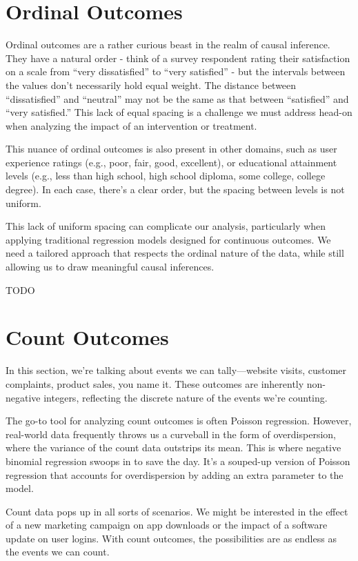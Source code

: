 \documentclass[
  letterpaper,
  DIV=11,
  numbers=noendperiod]{scrreprt}
\begin{document}
\section{Ordinal Outcomes}\label{ordinal-outcomes}

Ordinal outcomes are a rather curious beast in the realm of causal
inference. They have a natural order - think of a survey respondent
rating their satisfaction on a scale from ``very dissatisfied'' to
``very satisfied'' - but the intervals between the values don't
necessarily hold equal weight. The distance between ``dissatisfied'' and
``neutral'' may not be the same as that between ``satisfied'' and ``very
satisfied.'' This lack of equal spacing is a challenge we must address
head-on when analyzing the impact of an intervention or treatment.

This nuance of ordinal outcomes is also present in other domains, such
as user experience ratings (e.g., poor, fair, good, excellent), or
educational attainment levels (e.g., less than high school, high school
diploma, some college, college degree). In each case, there's a clear
order, but the spacing between levels is not uniform.

This lack of uniform spacing can complicate our analysis, particularly
when applying traditional regression models designed for continuous
outcomes. We need a tailored approach that respects the ordinal nature
of the data, while still allowing us to draw meaningful causal
inferences.

TODO

\section{Count Outcomes}\label{count-outcomes}

In this section, we're talking about events we can tally---website
visits, customer complaints, product sales, you name it. These outcomes
are inherently non-negative integers, reflecting the discrete nature of
the events we're counting.

The go-to tool for analyzing count outcomes is often Poisson regression.
However, real-world data frequently throws us a curveball in the form of
overdispersion, where the variance of the count data outstrips its mean.
This is where negative binomial regression swoops in to save the day.
It's a souped-up version of Poisson regression that accounts for
overdispersion by adding an extra parameter to the model.

Count data pops up in all sorts of scenarios. We might be interested in
the effect of a new marketing campaign on app downloads or the impact of
a software update on user logins. With count outcomes, the possibilities
are as endless as the events we can count.
\end{document}
